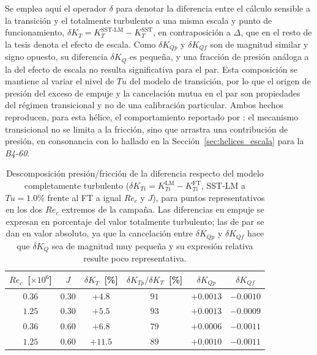 Se emplea aquí el operador $\delta$ para denotar la diferencia entre el cálculo sensible a la transición y el totalmente turbulento a una misma escala y punto de funcionamiento, $\delta K_T = K_T^{\text{SST-LM}} - K_T^{\text{SST}}$, en contraposición a $\Delta$, que en el resto de la tesis denota el efecto de escala. Como
$\delta K_{Qp}$ y $\delta K_{Qf}$ son de magnitud similar y signo opuesto, su diferencia
$\delta K_Q$ es pequeña, y una fracción de presión análoga a la del efecto de escala no
resulta significativa para el par. Esta composición se mantiene al variar el nivel de
$Tu$ del modelo de transición, por lo que el origen de presión del exceso de empuje y la
cancelación mutua en el par son propiedades del régimen transicional y no de una
calibración particular. Ambos hechos reproducen, para esta hélice, el comportamiento
reportado por \citet{gaggero2018transition}: el mecanismo transicional no se limita a la
fricción, sino que arrastra una contribución de presión, en consonancia con lo hallado en
la Sección~\ref{sec:helices_escala} para la \textit{B4-60}.

\begin{table}[htpb]
\centering
\footnotesize
\caption{Descomposición presión/fricción de la diferencia respecto del modelo
completamente turbulento ($\delta K_{Ti} = K_{Ti}^{\mathrm{LM}} - K_{Ti}^{\mathrm{FT}}$,
SST-LM a $Tu = 1.0\%$ frente al FT a igual $Re_c$ y $J$), para puntos representativos en
los dos $Re_c$ extremos de la campaña. Las diferencias en empuje se expresan en porcentaje del valor totalmente turbulento; las de par se dan en valor absoluto, ya que la cancelación entre $\delta K_{Qp}$ y $\delta K_{Qf}$ hace que $\delta K_Q$ sea de magnitud muy pequeña y su expresión relativa resulte poco representativa.}
\label{tab:coreana_decomp}
\begin{tabular}{cccccc}
\hline
$Re_c$~[$\times10^6$] & $J$ & $\delta K_T$~[\%] & $\delta K_{Tp}/\delta K_T$~[\%] & $\delta K_{Qp}$ & $\delta K_{Qf}$ \\
\hline
$0.36$ & $0.30$ & $+4.8$  & $91$ & $+0.0013$ & $-0.0010$ \\
$1.25$ & $0.30$ & $+5.5$  & $93$ & $+0.0013$ & $-0.0009$ \\
$0.36$ & $0.60$ & $+6.8$  & $79$ & $+0.0006$ & $-0.0011$ \\
$1.25$ & $0.60$ & $+11.5$ & $89$ & $+0.0010$ & $-0.0011$ \\
\hline
\end{tabular}
\end{table}

